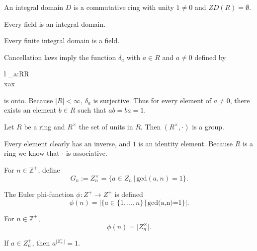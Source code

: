 \documentclass{article}
\begin{document}
\begin{defi}
	An integral domain \(D\) is a commutative ring with unity \(1\neq 0\) and \(ZD(R)=\emptyset\).
\end{defi}
\begin{rema}
	Every field is an integral domain.
\end{rema}
\begin{thm}
	Every finite integral domain is a field.
	\begin{IEEEproof}
		Cancellation laws imply the function \(\delta_a\) with \(a\in R\) and \(a\neq 0\) defined by
		\begin{IEEEeqnarray*}{l}
			\delta_a:R\rightarrow R\\
			x\rightarrow ax
		\end{IEEEeqnarray*}
		is onto. Because \(\lvert R\rvert<\infty\), \(\delta_a\) is surjective. Thus for every element of \(a\neq 0\), there exists an element \(b\in R\) such that \(ab=ba=1\).
	\end{IEEEproof}
\end{thm}
\begin{thm}
	Let \(R\) be a ring and \(R^\times\) the set of units in \(R\). Then \((R^\times,\cdot)\) is a group.
	\begin{IEEEproof}
		Every element clearly has an inverse, and \(1\) is an identity element. Because \(R\) is a ring we know that \(\cdot\) is associative.
	\end{IEEEproof}
\end{thm}
\begin{defi}
	For \(n\in\mathbb{Z}^+\), define
	\begin{equation*}
		G_n:=Z_n^\times=\{a\in Z_n\,|\,\text{gcd}(a,n)=1\}.
	\end{equation*}
\end{defi}
\begin{defi}
	The Euler phi-function \(\phi:Z^+\rightarrow Z^+\) is defined
	\begin{equation*}
		\phi(n)=\lvert\{a\in\{1,\ldots,n\}\,|\,\text{gcd(a,n)=1}\}\rvert.
	\end{equation*}
\end{defi}
\begin{lem}
	For \(n\in\mathbb{Z}^+\),
	\begin{equation*}
		\phi(n)=\lvert Z_n^\times\rvert.
	\end{equation*}
\end{lem}
\begin{lem}
	If \(a\in Z_n^+\), then \(a^{\lvert Z_n^+\rvert}=1\).
	\begin{IEEEproof}
	\end{IEEEproof}
\end{lem}
\end{document}
